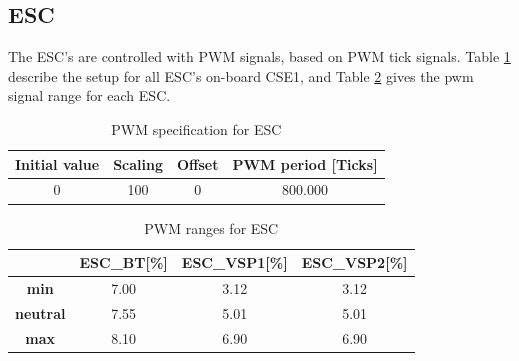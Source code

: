 \subsection{ESC}
The ESC's are controlled with PWM signals, based on PWM tick signals. Table \ref{tab:pwm_spec} describe the setup for all ESC's on-board CSE1, and Table \ref{tab:pwm_range} gives the pwm signal range for each ESC.
\begin{table}[h!]
	\centering
	\caption{PWM specification for ESC}
	\label{tab:pwm_spec}
	\begin{tabular}{cccc}
		\hline
		\textbf{Initial value} & \textbf{Scaling} & \textbf{Offset} & \textbf{PWM period} [Ticks] \\ \hline
		0 & 100 & 0 & 800.000\\ \hline
	\end{tabular}
\end{table}

\begin{table}[h!]
	\centering
	\caption{PWM ranges for ESC}
	\label{tab:pwm_range}
	\begin{tabular}{cccc}
		\hline
		& \textbf{ESC\_BT}[\%] & \textbf{ESC\_VSP1}[\%] & \textbf{ESC\_VSP2}[\%]\\ \hline
		\textbf{min} & 7.00 & 3.12 & 3.12\\
		\textbf{neutral} & 7.55 & 5.01 & 5.01\\
		\textbf{max} & 8.10 & 6.90 & 6.90\\ \hline
	\end{tabular}
\end{table}

